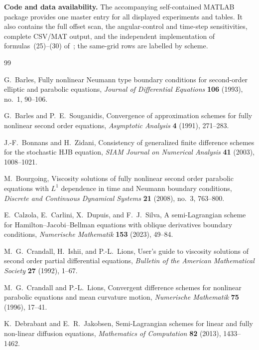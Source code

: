\documentclass[11pt]{article}
\theoremstyle{definition}
\theoremstyle{remark}
\begin{document}
	\medskip
	\noindent\textbf{Code and data availability.}
	The accompanying self-contained MATLAB package provides one master entry for
	all displayed experiments and tables.  It also contains the full offset scan,
	the angular-control and time-step sensitivities, complete CSV/MAT output, and
	the independent implementation of formulas~(25)--(30)
	of~\cite{CalzolaEtAl2023}; the same-grid rows are labelled by scheme.
	
	\begin{thebibliography}{99}
	\small
		
		G.~Barles,
		Fully nonlinear Neumann type boundary conditions for second-order elliptic and parabolic equations,
		\emph{Journal of Differential Equations} \textbf{106} (1993), no.~1, 90--106.
		
		G.~Barles and P.~E.~Souganidis,
		Convergence of approximation schemes for fully nonlinear second order equations,
		\emph{Asymptotic Analysis} \textbf{4} (1991), 271--283.
		
		J.-F.~Bonnans and H.~Zidani,
		Consistency of generalized finite difference schemes for the stochastic HJB equation,
		\emph{SIAM Journal on Numerical Analysis} \textbf{41} (2003), 1008--1021.
		
		M.~Bourgoing,
		Viscosity solutions of fully nonlinear second order parabolic equations with $L^1$ dependence in time and Neumann boundary conditions,
		\emph{Discrete and Continuous Dynamical Systems} \textbf{21} (2008), no.~3, 763--800.
		
		E.~Calzola, E.~Carlini, X.~Dupuis, and F.~J.~Silva,
		A semi-Lagrangian scheme for Hamilton--Jacobi--Bellman equations with oblique derivatives boundary conditions,
		\emph{Numerische Mathematik} \textbf{153} (2023), 49--84.
		
		M.~G.~Crandall, H.~Ishii, and P.-L.~Lions,
		User's guide to viscosity solutions of second order partial differential equations,
		\emph{Bulletin of the American Mathematical Society} \textbf{27} (1992), 1--67.
		
		M.~G.~Crandall and P.-L.~Lions,
		Convergent difference schemes for nonlinear parabolic equations and mean curvature motion,
		\emph{Numerische Mathematik} \textbf{75} (1996), 17--41.
		
		K.~Debrabant and E.~R.~Jakobsen,
		Semi-Lagrangian schemes for linear and fully non-linear diffusion equations,
		\emph{Mathematics of Computation} \textbf{82} (2013), 1433--1462.
		

\end{thebibliography}
\end{document}
